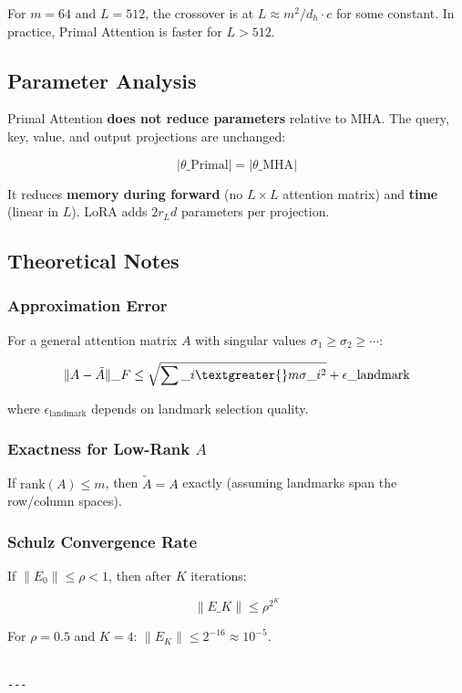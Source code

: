 For $m = 64$ and $L = 512$, the crossover is at $L \approx m^2 / d_h \cdot c$ 
for some constant. In practice, Primal Attention is faster for $L > 512$.

\subsection{Parameter Analysis}

Primal Attention \textbf{does not reduce parameters} relative to MHA. The query, 
key, value, and output projections are unchanged:

\[
|\theta\_\text{Primal}| = |\theta\_\text{MHA}|
\]

It reduces \textbf{memory during forward} (no $L \times L$ attention matrix) and 
\textbf{time} (linear in $L$). LoRA adds $2 r_L d$ parameters per projection.

\subsection{Theoretical Notes}

\subsubsection{Approximation Error}

For a general attention matrix $A$ with singular values $\sigma_1 \ge \sigma_2 \ge \cdots$:

\[
\|A - \tilde{A}\|\_F \leq \sqrt{\sum\_{i \textgreater{} m} \sigma\_i^2} + \epsilon\_\text{landmark}
\]

where $\epsilon_\text{landmark}$ depends on landmark selection quality.

\subsubsection{Exactness for Low-Rank $A$}

If $\text{rank}(A) \le m$, then $\tilde{A} = A$ exactly (assuming landmarks 
span the row/column spaces).

\subsubsection{Schulz Convergence Rate}

If $\|E_0\| \le \rho < 1$, then after $K$ iterations:

\[
\|E\_K\| \le \rho^{2^K}
\]

For $\rho = 0.5$ and $K = 4$: $\|E_K\| \le 2^{-16} \approx 10^{-5}$.
\begin{lstlisting}

---
\end{lstlisting}